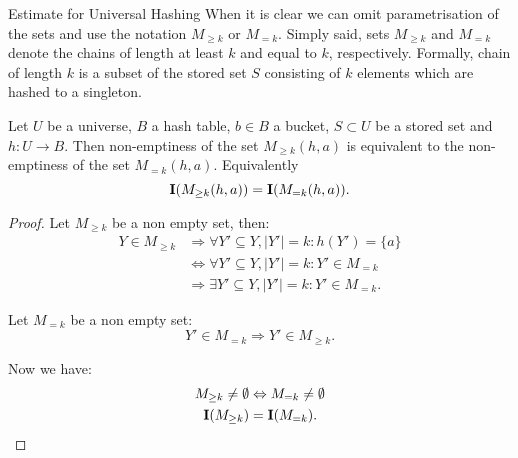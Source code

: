 \begin{section}{Estimate for Universal Hashing}
When it is clear we can omit parametrisation of the sets and use the notation $M_{\geq k}$ or $M_{= k}$. Simply said, sets $M_{\geq k}$ and $M_{= k}$ denote the chains of length at least $k$ and equal to $k$, respectively. Formally, chain of length $k$ is a subset of the stored set $S$ consisting of $k$ elements which are hashed to a singleton.

\begin{lemma}
\label{lemma-indicator-k-collision}
Let $U$ be a universe, $B$ a hash table, $b \in B$ a bucket, $S \subset U$ be a stored set and $h: U \rightarrow B$. Then non-emptiness of the set $M_{\geq k}(h, a)$ is equivalent to the non-emptiness of the set $M_{= k}(h, a)$. Equivalently
\begin{displaymath}
\mathbf{I}(M_{\geq k}(h, a)) = \mathbf{I}(M_{= k}(h, a)) \text{.}
\end{displaymath}
\begin{proof}
Let $M_{\geq k}$ be a non empty set, then:
\begin{displaymath}
\begin{split}
Y \in M_{\geq k} 
	& \Rightarrow \forall Y' \subseteq Y, |Y'| = k: h(Y') = \{a\} \\
	& \Leftrightarrow \forall Y' \subseteq Y, |Y'| = k: Y' \in M_{=k} \\
	& \Rightarrow \exists Y' \subseteq Y, |Y'| = k: Y' \in M_{=k} \text{.}
\end{split}
\end{displaymath}

Let $M_{=k}$ be a non empty set:
\begin{displaymath}
Y' \in M_{=k} \Rightarrow Y' \in M_{\geq k} \text{.}
\end{displaymath}

Now we have:
\begin{displaymath}
\begin{split}
M_{\geq k} \neq \emptyset & \Leftrightarrow  M_{= k} \neq \emptyset \\
\mathbf{I}(M_{\geq k}) & = \mathbf{I}(M_{= k}) \text{.}
\end{split}
\end{displaymath}
\end{proof}
\end{lemma}


\end{section}
